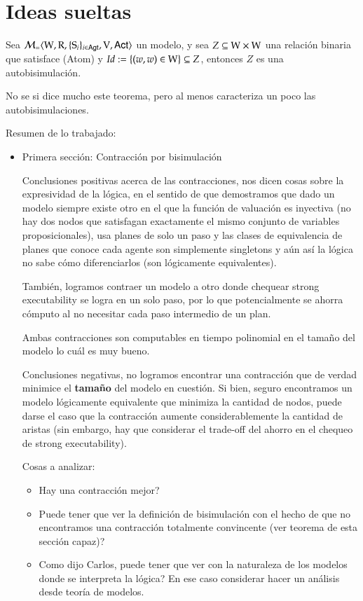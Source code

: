 \chapter{Ideas sueltas}

\begin{teorema}
    Sea $\mathcal{M}_=\langle \mathrm{W},\mathrm{R},\{ \mathrm{S}_i \}_{i \in {\rm \sf Agt}},\mathrm{V},{\rm \sf Act} \rangle$ un modelo, y sea $Z \subseteq \mathrm{W} \times \mathrm{W}$ una relación binaria que satisface (Atom) y $Id := \{(w,w)\in \mathrm{W}\} \subseteq Z$, entonces $Z$ es una autobisimulación.
\end{teorema}

No se si dice mucho este teorema, pero al menos caracteriza un poco las autobisimulaciones.

Resumen de lo trabajado:

\begin{itemize}

\item Primera sección: Contracción por bisimulación

Conclusiones positivas acerca de las contracciones, nos dicen cosas sobre la expresividad de la lógica, en el sentido de que demostramos que dado un modelo siempre existe otro en el que la función de valuación es inyectiva (no hay dos nodos que satisfagan exactamente el mismo conjunto de variables proposicionales), usa planes de solo un paso y las clases de equivalencia de planes que conoce cada agente son simplemente singletons y aún así la lógica no sabe cómo diferenciarlos (son lógicamente equivalentes).

También, logramos contraer un modelo a otro donde chequear strong executability se logra en un solo paso, por lo que potencialmente se ahorra cómputo al no necesitar cada paso intermedio de un plan.

Ambas contracciones son computables en tiempo polinomial en el tamaño del modelo lo cuál es muy bueno.


Conclusiones negativas, no logramos encontrar una contracción que de verdad minimice el \rm\textbf{tamaño} del modelo en cuestión. Si bien, seguro encontramos un modelo lógicamente equivalente que minimiza la cantidad de nodos, puede darse el caso que la contracción aumente considerablemente la cantidad de aristas (sin embargo, hay que considerar el trade-off del ahorro en el chequeo de strong executability).

Cosas a analizar: 
\begin{itemize}
    \item Hay una contracción mejor?
    \item Puede tener que ver la definición de bisimulación con el hecho de que no encontramos una contracción totalmente convincente (ver teorema de esta sección capaz)? 
    \item Como dijo Carlos, puede tener que ver con la naturaleza de los modelos donde se interpreta la lógica? En ese caso considerar hacer un análisis desde teoría de modelos.
\end{itemize}



\end{itemize}
